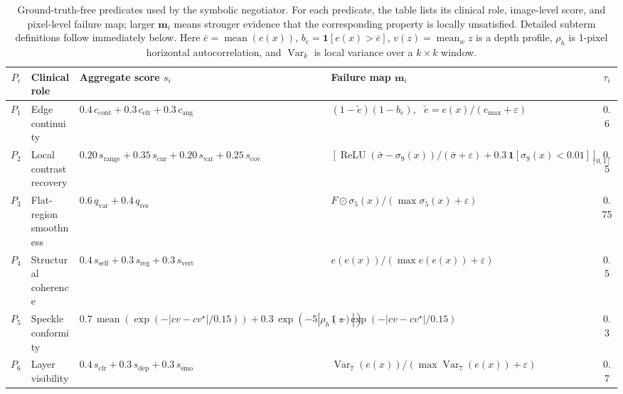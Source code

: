 \documentclass{ieeetj}
\begin{document}
\begin{table}[t]
\centering
\caption{Ground-truth-free predicates used by the symbolic negotiator. For each predicate, the table lists its clinical role, image-level score, and pixel-level failure map; larger $\mathbf{m}_i$ means stronger evidence that the corresponding property is locally unsatisfied. Detailed subterm definitions follow immediately below. Here $\bar e=\operatorname{mean}(e(x))$, $b_e=\mathbf{1}[e(x)>\bar e]$, $v(z)=\operatorname{mean}_w z$ is a depth profile, $\rho_h$ is 1-pixel horizontal autocorrelation, and $\operatorname{Var}_k$ is local variance over a $k\times k$ window.}
\label{tab:predicates}
\setlength{\tabcolsep}{3pt}
\footnotesize
\begin{tabular}{cp{}p{}p{}c}
\toprule
$P_i$ & Clinical role & Aggregate score $s_i$ & Failure map $\mathbf{m}_i$ & $\tau_i$ \\
\midrule
$P_1$ & Edge continuity &
$0.4\,c_{\text{cont}}+0.3\,c_{\text{efr}}+0.3\,c_{\text{ang}}$ &
$(1-\tilde e)(1-b_e)$, \ $\tilde e=e(x)/(e_{\max}+\varepsilon)$ &
0.6 \\
$P_2$ & Local contrast recovery &
$0.20\,s_{\text{range}}+0.35\,s_{\text{cnr}}+0.20\,s_{\text{var}}+0.25\,s_{\text{cov}}$ &
$[\operatorname{ReLU}(\bar\sigma-\sigma_9(x))/(\bar\sigma+\varepsilon)+0.3\,\mathbf{1}[\sigma_9(x)<0.01]]_{[0,1]}$ &
0.5 \\
$P_3$ & Flat-region smoothness &
$0.6\,q_{\text{var}}+0.4\,q_{\text{res}}$ &
$F \odot \sigma_5(x)/(\max \sigma_5(x)+\varepsilon)$ &
0.75 \\
$P_4$ & Structural coherence &
$0.4\,s_{\text{self}}+0.3\,s_{\text{reg}}+0.3\,s_{\text{vert}}$ &
$e(e(x))/(\max e(e(x))+\varepsilon)$ &
0.5 \\
$P_5$ & Speckle conformity &
$0.7\,\operatorname{mean}(\exp(-|cv-cv^\star|/0.15))+0.3\,\exp(-5|\rho_h(z)|)$ &
$1-\exp(-|cv-cv^\star|/0.15)$ &
0.3 \\
$P_6$ & Layer visibility &
$0.4\,s_{\text{clr}}+0.3\,s_{\text{dep}}+0.3\,s_{\text{smo}}$ &
$\operatorname{Var}_7(e(x))/(\max \operatorname{Var}_7(e(x))+\varepsilon)$ &
0.7 \\
\bottomrule
\end{tabular}
\end{table}
\end{document}
